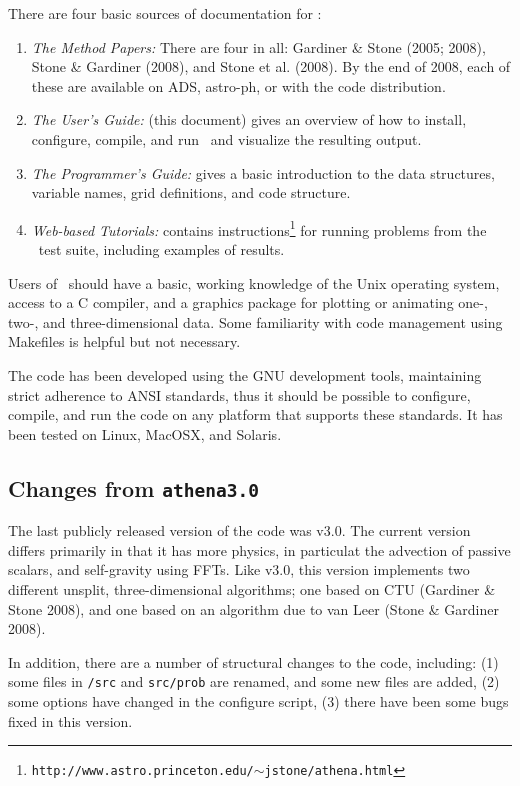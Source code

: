 There are four basic sources of documentation for \ath:
\begin{enumerate}

\item {\it The Method Papers:} There are four in all: Gardiner \& Stone
(2005; 2008), Stone \& Gardiner (2008), and Stone et al. (2008).  By the
end of 2008, each of these are available on ADS, astro-ph, or with the
code distribution.

\item {\it The User's Guide:} (this document) gives an overview of how to
install, configure, compile, and run \ath\ and visualize the resulting output.

\item {\it The Programmer's Guide:} gives a basic introduction to the 
data structures, variable names, grid definitions, and code structure.

\item {\it Web-based Tutorials:} contains
instructions\footnote{{\tt http://www.astro.princeton.edu/$\sim$jstone/athena.html}}
for running problems from the \ath\ test suite, including examples of results.

\end{enumerate}
Users of \ath\ should have a basic, working knowledge of the Unix
operating system, access to a C compiler, and a graphics package for
plotting or animating one-, two-, and three-dimensional data.  Some familiarity
with code management using Makefiles is helpful but not necessary.

The code has been developed using the GNU development tools,
maintaining strict adherence to ANSI standards, thus it should be possible
to configure, compile, and run the code on any platform that supports these
standards.  It has been tested on Linux, MacOSX, and Solaris.

\subsection{Changes from {\tt athena3.0}}

The last publicly released version of the code was v3.0.  The current
version differs primarily in that it has more physics, in particulat the
advection of passive scalars, and self-gravity using FFTs.  Like v3.0,
this version implements two different unsplit, three-dimensional
algorithms; one based on CTU (Gardiner \& Stone 2008), and one based on
an algorithm due to van Leer (Stone \& Gardiner 2008).

In addition, there are a number of structural changes to the code, including:
(1) some files in {\tt /src} and {\tt src/prob} are renamed, and some new files are added,
(2) some options have changed in the configure script,
(3) there have been some bugs fixed in this version.

